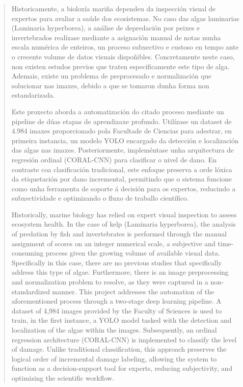 
\pagestyle{empty}
\begin{abstract}

Historicamente, a bioloxía mariña dependeu da inspección visual de expertos para avaliar a saúde
dos ecosistemas. No caso das algas laminarias (Laminaria hyperborea), a análise de depredación por
peixes e invertebrados realízase mediante a asignación manual de notas nunha escala numérica de
enteiros, un proceso subxectivo e custoso en tempo ante o crecente volume de datos visuais
dispoñibles. Concretamente neste caso, non existen estudos previos que traten
especificamente este tipo de alga. Ademais, existe un problema de preprocesado e normalización
que solucionar nas imaxes, debido a que se tomaron dunha forma non estandarizada.

Este proxecto aborda a automatización do citado proceso mediante un pipeline de dúas etapas de aprendizaxe
profundo. Utilízase un dataset de 4.984 imaxes proporcionado pola Facultade de Ciencias para
adestrar, en primeira instancia, un modelo YOLO encargado da detección e localización das algas nas
imaxes. Posteriormente, impleméntase unha arquitectura de regresión ordinal (CORAL-CNN) para
clasificar o nivel de dano. En contraste coa clasificación tradicional, este enfoque preserva a orde lóxica
da etiquetación por dano incremental, permitindo que o sistema funcione como unha ferramenta de soporte á decisión para os expertos, reducindo a subxectividade e optimizando o fluxo de
traballo científico.

  \vspace*{25pt}
  \begin{segundoresumo}
  
Historically, marine biology has relied on expert visual inspection to assess ecosystem health. In the case of kelp (Laminaria hyperborea), the analysis of predation by fish and invertebrates is performed through the manual assignment of scores on an integer numerical scale, a subjective and time-consuming process given the growing volume of available visual data. Specifically in this case, there are no previous studies that specifically address this type of algae. Furthermore, there is an image preprocessing and normalization problem to resolve, as they were captured in a non-standardized manner. This project addresses the automation of the aforementioned process through a two-stage deep learning pipeline. A dataset of 4,984 images provided by the Faculty of Sciences is used to train, in the first instance, a YOLO model tasked with the detection and localization of the algae within the images. Subsequently, an ordinal regression architecture (CORAL-CNN) is implemented to classify the level of damage. Unlike traditional classification, this approach preserves the logical order of incremental damage labeling, allowing the system to function as a decision-support tool for experts, reducing subjectivity, and optimizing the scientific workflow.


  \end{segundoresumo}
\vspace*{25pt}

\end{abstract}
\pagestyle{fancy}

